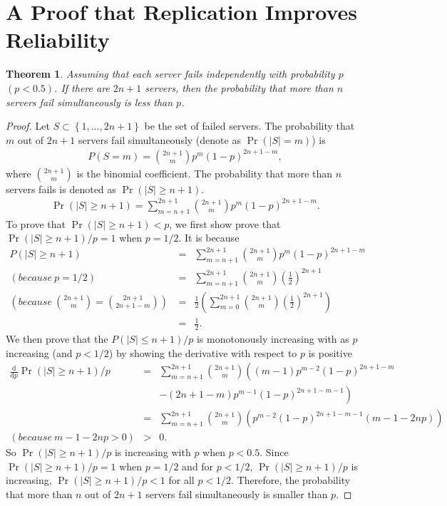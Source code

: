 \documentclass[11pt]{article}
\newtheorem{thm}{Theorem}
\begin{document}
\section{A Proof that Replication Improves Reliability}
\begin{thm}
    \label{thm:1}
    Assuming that each server fails independently with probability $p$ $(p<0.5)$.
    If there are $2n+1$ servers, then the probability that more than $n$ servers fail simultaneously is less than $p$.
\end{thm}
\begin{proof}
    Let $S \subset \left\{1,\ldots,2n+1\right\}$ be the set of failed servers.
    The probability that $m$ out of $2n+1$ servers fail simultaneously (denote as $\Pr(|S|=m)$) is 
    \begin{eqnarray*}
        P(S=m) = \binom{2n+1}{m} p^{m} (1-p)^{2n+1-m},
    \end{eqnarray*}
    where $\binom{2n+1}{m}$ is the binomial coefficient.
    The probability that more than $n$ servers fails is denoted as $\Pr(|S|\geq n+1)$.
    \begin{eqnarray*}
        \Pr\left(|S|\geq n+1\right) = \sum_{m=n+1}^{2n+1} \binom{2n+1}{m} p^{m} (1-p)^{2n+1-m}.
    \end{eqnarray*}
    To prove that $\Pr(|S|\geq n+1) < p$, we first show prove that $\Pr(|S|\geq n+1)/p = 1$ 
    when $p=1/2$. It is because
    \begin{eqnarray*}
        P(|S|\geq n+1) &=& \sum_{m=n+1}^{2n+1} \binom{2n+1}{m} p^{m} (1-p)^{2n+1-m} \\ 
        (because~p=1/2)~&=& \sum_{m=n+1}^{2n+1} \binom{2n+1}{m} \left(\frac{1}{2}\right)^{2n+1} \\
        \left(because~\binom{2n+1}{m}=\binom{2n+1}{2n+1-m}\right)~&=& \frac{1}{2}\left(  \sum_{m=0}^{2n+1} 
        \binom{2n+1}{m} \left(\frac{1}{2}\right)^{2n+1} \right) \\
        &=& \frac{1}{2}.
    \end{eqnarray*}
    We then prove that the $P(|S|\leq n+1)/p$ is monotonously increasing with as $p$ 
    increasing (and $p<1/2$) by showing the derivative with respect to $p$ is positive
    \begin{eqnarray*}
        \frac{\mathrm{d}}{\mathrm{d}p}\Pr(|S|\geq n+1)/p &=& \sum_{m=n+1}^{2n+1} \binom{2n+1}{m} \left(\left(m-1\right)p^{m-2}
        \left(1-p\right)^{2n+1-m} \right.\\
        &&\left. - \left(2n+1-m\right)p^{m-1}\left(1-p\right)^{2n+1-m-1}\right) \\
        &=& \sum_{m=n+1}^{2n+1} \binom{2n+1}{m} \left(p^{m-2} 
        \left(1-p\right)^{2n+1-m-1}\left(m-1-2np\right)\right)\\
        (because~m-1-2np>0)&>& 0.
    \end{eqnarray*}
    So $\Pr(|S|\geq n+1)/p$ is increasing with $p$ when $p<0.5$.
    Since $\Pr(|S|\geq n+1)/p=1$ when $p=1/2$ and for $p<1/2$, $\Pr(|S|\geq n+1)/p$ is 
    increasing, $\Pr(|S|\geq n+1)/p < 1$ for all $p<1/2$. Therefore, the probability 
    that more than $n$ out of $2n+1$ servers fail simultaneously is smaller than 
    $p$.
\end{proof}
\end{document}
